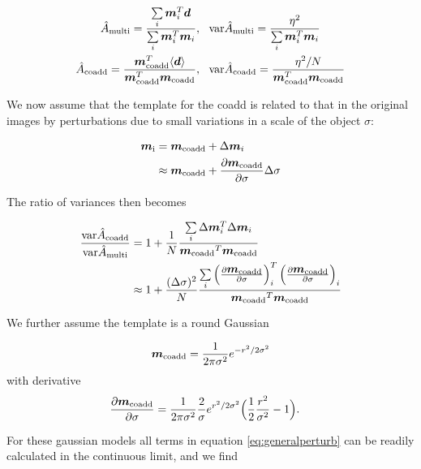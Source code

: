 \documentclass[fleqn,useAMS,usenatbib]{mnras}
\newcommand{\coadd}{{\rm coadd}}
\newcommand{\model}{\mbox{$\boldsymbol{m}$}}
\newcommand{\modelc}{\mbox{$\boldsymbol{m}_\coadd$}}
\begin{document}
\begin{align}
\hat{A}_{\rm multi} = \frac{\sum\limits_i \boldsymbol{m}_i^T 
\boldsymbol{d}}{\sum\limits_i \boldsymbol{m}_i^T \boldsymbol{m}_i}&, ~~
{\rm var}\hat{A}_{\rm multi} = \frac{\eta^2}{\sum\limits_i 
\boldsymbol{m}_i^T \boldsymbol{m}_i}\\
\hat{A}_\coadd = \frac{\boldsymbol{m}_\coadd^T \langle \boldsymbol{d} 
\rangle}{\boldsymbol{m}_\coadd^T \boldsymbol{m}_\coadd}&, ~~
{\rm var}\hat{A}_\coadd = \frac{\eta^2/N}{\boldsymbol{m}_\coadd^T 
\boldsymbol{m}_\coadd}
\end{align}

We now assume that the template for the coadd is related to that
in the original images by perturbations due to small variations
in a scale of the object $\sigma$:

\begin{align}
\boldsymbol{m}_{\rm i} &= \boldsymbol{m}_\coadd + \Delta \boldsymbol{m}_i \\
&\approx \boldsymbol{m}_\coadd + \frac{\partial 
\boldsymbol{m}_\coadd}{\partial \sigma} \Delta \sigma
\end{align}

The ratio of variances then becomes

\begin{align} \label{eq:generalperturb}
\frac{ {\rm var} \hat{A}_\coadd }{{\rm var} \hat{A}_{\rm multi} } &=  
1 + \frac{1}{N}\frac{\sum\limits_i \Delta \model_i^T \Delta \model_i 
}{\modelc^T \modelc} \\
& \approx 
1 + \frac{(\Delta \sigma)^2}{N}\frac{\sum\limits_i \left( \frac{\partial 
\modelc}{\partial \sigma} \right)_i^T \left( \frac{\partial \modelc}{\partial 
\sigma} \right)_i }{\modelc^T \modelc}
\end{align}

We further assume the template is a round Gaussian

\begin{align}
\modelc = \frac{1}{2 \pi \sigma^2} e^{-r^2/2 \sigma^2 }
\end{align}
with derivative
\begin{align}
\frac{\partial \modelc}{\partial \sigma} &= \frac{1}{2 \pi \sigma^2} 
\frac{2}{\sigma} e^{r^2/2 \sigma^2} \Bigl( \frac{1}{2}\frac{r^2}{\sigma^2} - 1 
\Bigr).
\end{align}

For these gaussian models all terms in equation \ref{eq:generalperturb} can
be readily calculated in the continuous limit, and we find
\end{document}
